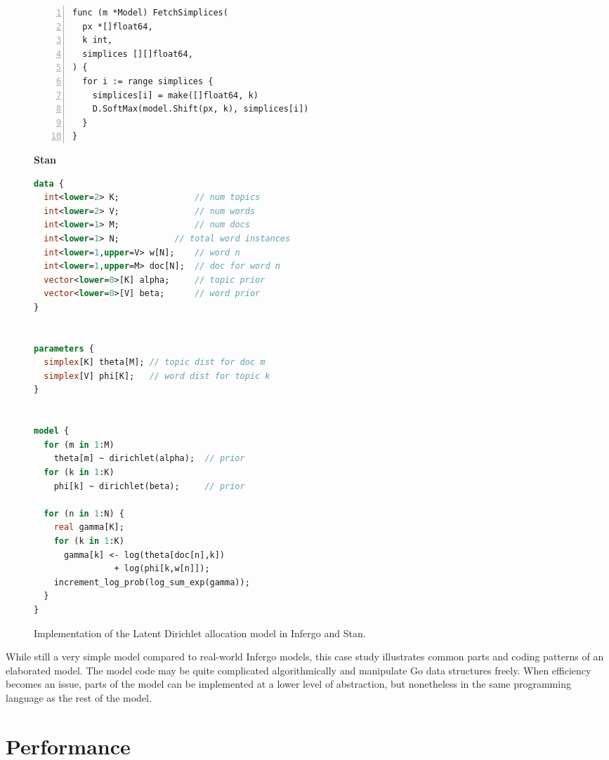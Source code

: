 \documentclass[sigplan,screen]{acmart}
\begin{document}
\begin{sloppypar}
\begin{figure*}
\begin{minipage}[t]{0.49\textwidth}
\begin{lstlisting}[xleftmargin=11pt,framexleftmargin=10pt,numbers=left]
func (m *Model) FetchSimplices(
  px *[]float64,
  k int,
  simplices [][]float64,
) {
  for i := range simplices {
    simplices[i] = make([]float64, k)
    D.SoftMax(model.Shift(px, k), simplices[i])
  }
}
\end{lstlisting}
\end{minipage}
\hfill
\begin{minipage}[t]{0.49\textwidth}
  \centering
  
  \textbf{Stan}

\begin{lstlisting}[language=Stan]
data {
  int<lower=2> K;               // num topics
  int<lower=2> V;               // num words
  int<lower=1> M;               // num docs
  int<lower=1> N;           // total word instances
  int<lower=1,upper=V> w[N];    // word n
  int<lower=1,upper=M> doc[N];  // doc for word n
  vector<lower=0>[K] alpha;     // topic prior
  vector<lower=0>[V] beta;      // word prior
}


parameters {
  simplex[K] theta[M]; // topic dist for doc m
  simplex[V] phi[K];   // word dist for topic k
}


model {
  for (m in 1:M)
    theta[m] ~ dirichlet(alpha);  // prior
  for (k in 1:K)
    phi[k] ~ dirichlet(beta);     // prior

  for (n in 1:N) {
    real gamma[K];
    for (k in 1:K)
      gamma[k] <- log(theta[doc[n],k])
                + log(phi[k,w[n]]);
    increment_log_prob(log_sum_exp(gamma));
  }
}
\end{lstlisting}
\end{minipage}
\caption{Implementation of the Latent Dirichlet allocation model in Infergo and Stan.}
\label{fig:lda}
\end{figure*}


While still a very simple model compared to real-world Infergo
models, this case study illustrates common parts and coding
patterns of an elaborated model. The model code may be quite
complicated algorithmically and manipulate Go data structures
freely. When efficiency becomes an issue, parts of the model
can be implemented at a lower level of abstraction, but
nonetheless in the same programming language as the rest of the
model.

\section{Performance}


\end{sloppypar}
\end{document}
